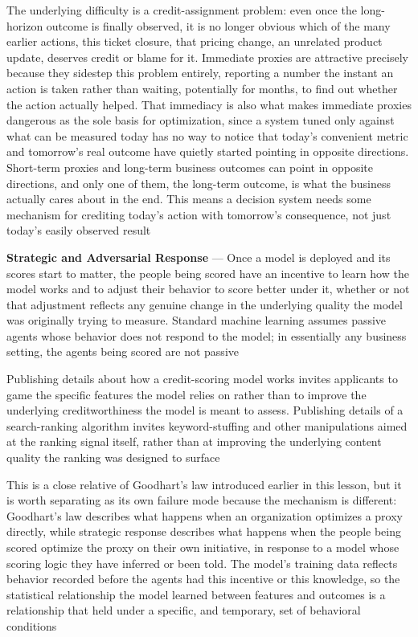 The underlying difficulty is a credit-assignment problem: even once the long-horizon
outcome is finally observed, it is no longer obvious which of the many earlier
actions, this ticket closure, that pricing change, an unrelated product update,
deserves credit or blame for it. Immediate proxies are attractive precisely because
they sidestep this problem entirely, reporting a number the instant an action is
taken rather than waiting, potentially for months, to find out whether the
action actually helped. That immediacy is also what makes immediate proxies dangerous
as the sole basis for optimization, since a system tuned only against what can
be measured today has no way to notice that today's convenient metric and
tomorrow's real outcome have quietly started pointing in opposite directions. Short-term
proxies and long-term business outcomes can point in opposite directions, and
only one of them, the long-term outcome, is what the business actually cares
about in the end. This means a decision system needs some mechanism for crediting
today's action with tomorrow's consequence, not just today's easily observed
result

\textbf{Strategic and Adversarial Response} --- Once a model is deployed and its
scores start to matter, the people being scored have an incentive to learn how the
model works and to adjust their behavior to score better under it, whether or
not that adjustment reflects any genuine change in the underlying quality the
model was originally trying to measure. Standard machine learning assumes passive
agents whose behavior does not respond to the model; in essentially any business
setting, the agents being scored are not passive

Publishing details about how a credit-scoring model works invites applicants to
game the specific features the model relies on rather than to improve the
underlying creditworthiness the model is meant to assess. Publishing details of a
search-ranking algorithm invites keyword-stuffing and other manipulations aimed at
the ranking signal itself, rather than at improving the underlying content
quality the ranking was designed to surface

This is a close relative of Goodhart's law introduced earlier in this lesson,
but it is worth separating as its own failure mode because the mechanism is
different: Goodhart's law describes what happens when an organization optimizes a
proxy directly, while strategic response describes what happens when the people
being scored optimize the proxy on their own initiative, in response to a model whose
scoring logic they have inferred or been told. The model's training data
reflects behavior recorded before the agents had this incentive or this
knowledge, so the statistical relationship the model learned between features and
outcomes is a relationship that held under a specific, and temporary, set of behavioral
conditions

